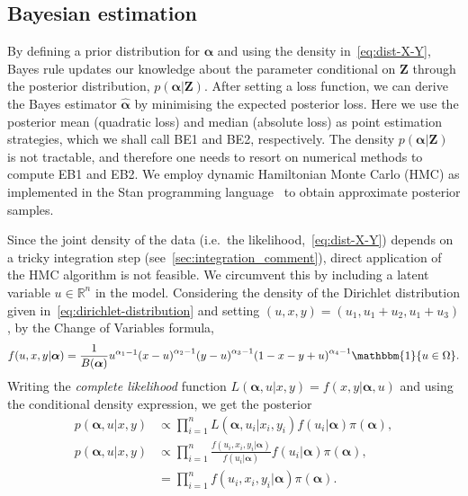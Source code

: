 \documentclass[a4paper, notitlepage, 10pt]{article}
\newcommand{\R}{\mathbb{R}}
\newcommand{\dd}{\boldsymbol{Z}}
\newcommand{\parameter}{\boldsymbol{\alpha}}
\newcommand{\one}{\mathbbm{1}}
\theoremstyle{definition}
\begin{document}
\subsection{Bayesian estimation}\label{sec:bayesian_estimation}

By defining a prior distribution for $\parameter$ and using the density in~\eqref{eq:dist-X-Y}, Bayes rule updates our knowledge about the parameter conditional on $\dd$ through the posterior distribution, $p(\parameter | \dd)$.
After setting a loss function, we can derive the Bayes estimator $\hat{\boldsymbol\alpha}$ by minimising the expected posterior loss.
Here we use the posterior mean (quadratic loss) and median (absolute loss) as point estimation strategies, which we shall call BE1 and BE2, respectively.
The density $p(\parameter | \dd)$ is not tractable, and therefore one needs to resort on numerical methods to compute EB1 and EB2.
We employ dynamic Hamiltonian Monte Carlo (HMC) as implemented in the Stan programming language~\cite[]{stan} to obtain approximate posterior samples.

Since the joint density of the data (i.e.\ the likelihood,~\autoref{eq:dist-X-Y}) depends on a tricky integration step (see~\autoref{sec:integration_comment}), direct application of the HMC algorithm is not feasible.
We circumvent this by including a latent variable $u \in \R^n$ in the model.
Considering the density of the Dirichlet distribution given in~\eqref{eq:dirichlet-distribution} and setting $(u,x,y) = (u_1, u_1 + u_2, u_1 + u_3)$, by the Change of Variables formula, 
\[
f(u, x, y | \boldsymbol\alpha) = \frac{1}{B(\boldsymbol{\alpha})}u^{\alpha_1-1}{(x-u)}^{\alpha_2-1}{(y-u)}^{\alpha_3-1}{(1-x-y+u)}^{\alpha_4-1}\one\{u \in \Omega\}.
\]
Writing the \textit{complete likelihood} function $L(\boldsymbol{\alpha}, u| x,y) = f(x,y|\boldsymbol{\alpha}, u)$ and using the conditional density expression, we get the posterior 
\begin{equation*}
    \begin{split}
        p(\boldsymbol\alpha, u | x,y) &\propto \prod_{i=1}^n L(\boldsymbol{\alpha}, u_i| x_i, y_i)f(u_i|\boldsymbol{\alpha})\pi(\boldsymbol\alpha), \\
        p(\boldsymbol\alpha, u | x,y) &\propto \prod_{i=1}^n \frac{f(u_i, x_i, y_i | \boldsymbol\alpha)}{f(u_i|\boldsymbol{\alpha})}f(u_i|\boldsymbol{\alpha})\pi(\boldsymbol\alpha), \\
        &= \prod_{i=1}^n f(u_i,x_i,y_i|\boldsymbol{\alpha})\pi(\boldsymbol\alpha).
    \end{split}
\end{equation*}
\end{document}

